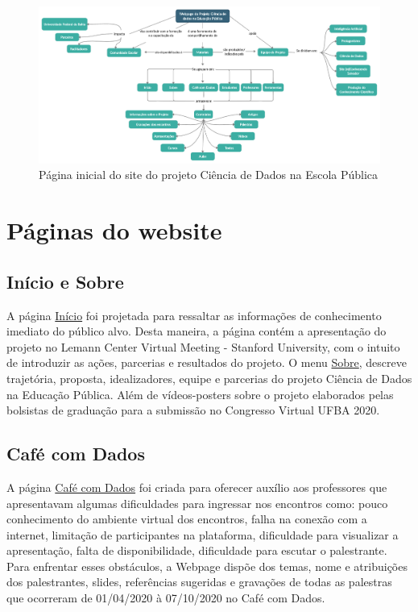 \documentclass[
]{book}
\begin{document}
\begin{figure}
\includegraphics[width=27.76in]{images/image26} \caption{Página inicial do site do projeto Ciência de Dados na Escola Pública}\label{fig:diagrpagcdnaep}
\end{figure}

\hypertarget{puxe1ginas-do-website}{%
\section{Páginas do website}\label{puxe1ginas-do-website}}

\hypertarget{inuxedcio-e-sobre}{%
\subsection*{Início e Sobre}\label{inuxedcio-e-sobre}}

A página \href{https://cienciadedadosep.wixsite.com/cdep}{Início} foi projetada para ressaltar as informações de conhecimento imediato do público alvo. Desta maneira, a página contém a apresentação do projeto no Lemann Center Virtual Meeting - Stanford University, com o intuito de introduzir as ações, parcerias e resultados do projeto.
O menu \href{https://cienciadedadosep.wixsite.com/cdep/sobre}{Sobre}, descreve trajetória, proposta, idealizadores, equipe e parcerias do projeto Ciência de Dados na Educação Pública. Além de vídeos-posters sobre o projeto elaborados pelas bolsistas de graduação para a submissão no Congresso Virtual UFBA 2020.

\hypertarget{cafuxe9-com-dados}{%
\subsection*{Café com Dados}\label{cafuxe9-com-dados}}

A página \href{https://cienciadedadosep.wixsite.com/cafecomdados}{Café com Dados} foi criada para oferecer auxílio aos professores que apresentavam algumas dificuldades para ingressar nos encontros como: pouco conhecimento do ambiente virtual dos encontros, falha na conexão com a internet, limitação de participantes na plataforma, dificuldade para visualizar a apresentação, falta de disponibilidade, dificuldade para escutar o palestrante.
Para enfrentar esses obstáculos, a Webpage dispõe dos temas, nome e atribuições dos palestrantes, slides, referências sugeridas e gravações de todas as palestras que ocorreram de 01/04/2020 à 07/10/2020 no Café com Dados.
\end{document}

